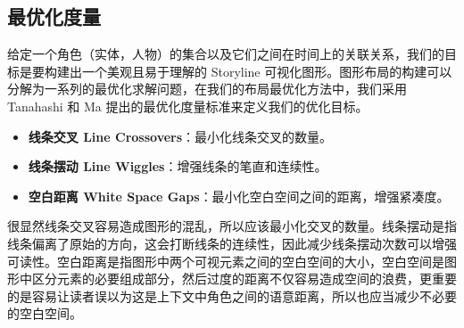\subsection{最优化度量}
\label{metrics}
给定一个角色（实体，人物）的集合以及它们之间在时间上的关联关系，我们的目标是要构建出一个美观且易于理解的 Storyline 可视化图形。图形布局的构建可以分解为一系列的最优化求解问题，在我们的布局最优化方法中，我们采用 Tanahashi 和 Ma \cite{tanahashi2012design} 提出的最优化度量标准来定义我们的优化目标。
\begin{itemize}
\item \textbf{线条交叉 Line Crossovers}：最小化线条交叉的数量。
\item \textbf{线条摆动 Line Wiggles}：增强线条的笔直和连续性。
\item \textbf{空白距离 White Space Gaps}：最小化空白空间之间的距离，增强紧凑度。
\end{itemize}
很显然线条交叉容易造成图形的混乱，所以应该最小化交叉的数量。线条摆动是指线条偏离了原始的方向，这会打断线条的连续性，因此减少线条摆动次数可以增强可读性。空白距离是指图形中两个可视元素之间的空白空间的大小，空白空间是图形中区分元素的必要组成部分，然后过度的距离不仅容易造成空间的浪费，更重要的是容易让读者误以为这是上下文中角色之间的语意距离，所以也应当减少不必要的空白空间。

